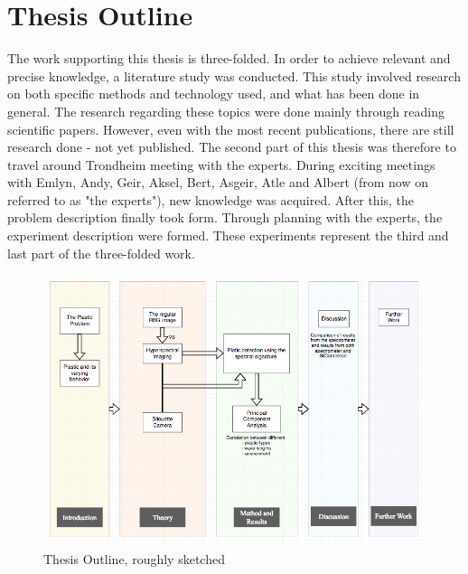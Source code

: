 \section{Thesis Outline}
The work supporting this thesis is three-folded. In order to achieve relevant and precise knowledge, a literature study was conducted. This study involved research on both specific methods and technology used, and what has been done in general. The research regarding these topics were done mainly through reading scientific papers. However, even with the most recent publications, there are still research done - not yet published. The second part of this thesis was therefore to travel around Trondheim meeting with the experts. During exciting meetings with Emlyn, Andy, Geir, Aksel, Bert, Asgeir, Atle and Albert (from now on referred to as "the experts"), new knowledge was acquired. After this, the problem description finally took form. Through planning with the experts, the experiment description were formed. These experiments represent the third and last part of the three-folded work. 


\begin{figure}
  \includegraphics[width=\linewidth]{Images/outline.png}
  \caption{Thesis Outline, roughly sketched}
  \label{fig:outline}
\end{figure}

